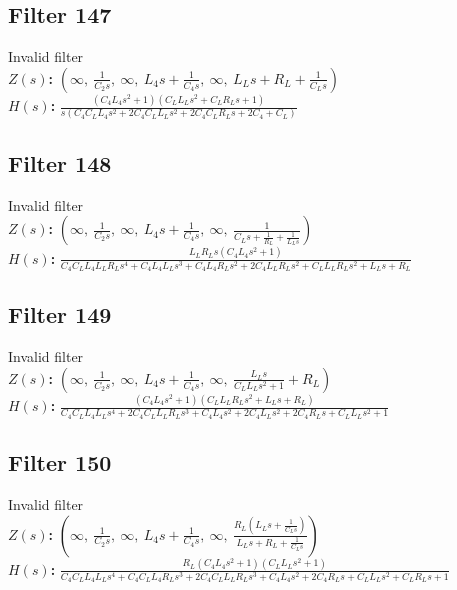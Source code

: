\documentclass{article}
\begin{document}
\subsection*{Filter 147}
Invalid filter \\ 
\textbf{$Z(s)$:} $\left( \infty, \  \frac{1}{C_{2} s}, \  \infty, \  L_{4} s + \frac{1}{C_{4} s}, \  \infty, \  L_{L} s + R_{L} + \frac{1}{C_{L} s}\right)$ \\ 
\textbf{$H(s)$:} $\frac{\left(C_{4} L_{4} s^{2} + 1\right) \left(C_{L} L_{L} s^{2} + C_{L} R_{L} s + 1\right)}{s \left(C_{4} C_{L} L_{4} s^{2} + 2 C_{4} C_{L} L_{L} s^{2} + 2 C_{4} C_{L} R_{L} s + 2 C_{4} + C_{L}\right)}$ \\ 
\subsection*{Filter 148}
Invalid filter \\ 
\textbf{$Z(s)$:} $\left( \infty, \  \frac{1}{C_{2} s}, \  \infty, \  L_{4} s + \frac{1}{C_{4} s}, \  \infty, \  \frac{1}{C_{L} s + \frac{1}{R_{L}} + \frac{1}{L_{L} s}}\right)$ \\ 
\textbf{$H(s)$:} $\frac{L_{L} R_{L} s \left(C_{4} L_{4} s^{2} + 1\right)}{C_{4} C_{L} L_{4} L_{L} R_{L} s^{4} + C_{4} L_{4} L_{L} s^{3} + C_{4} L_{4} R_{L} s^{2} + 2 C_{4} L_{L} R_{L} s^{2} + C_{L} L_{L} R_{L} s^{2} + L_{L} s + R_{L}}$ \\ 
\subsection*{Filter 149}
Invalid filter \\ 
\textbf{$Z(s)$:} $\left( \infty, \  \frac{1}{C_{2} s}, \  \infty, \  L_{4} s + \frac{1}{C_{4} s}, \  \infty, \  \frac{L_{L} s}{C_{L} L_{L} s^{2} + 1} + R_{L}\right)$ \\ 
\textbf{$H(s)$:} $\frac{\left(C_{4} L_{4} s^{2} + 1\right) \left(C_{L} L_{L} R_{L} s^{2} + L_{L} s + R_{L}\right)}{C_{4} C_{L} L_{4} L_{L} s^{4} + 2 C_{4} C_{L} L_{L} R_{L} s^{3} + C_{4} L_{4} s^{2} + 2 C_{4} L_{L} s^{2} + 2 C_{4} R_{L} s + C_{L} L_{L} s^{2} + 1}$ \\ 
\subsection*{Filter 150}
Invalid filter \\ 
\textbf{$Z(s)$:} $\left( \infty, \  \frac{1}{C_{2} s}, \  \infty, \  L_{4} s + \frac{1}{C_{4} s}, \  \infty, \  \frac{R_{L} \left(L_{L} s + \frac{1}{C_{L} s}\right)}{L_{L} s + R_{L} + \frac{1}{C_{L} s}}\right)$ \\ 
\textbf{$H(s)$:} $\frac{R_{L} \left(C_{4} L_{4} s^{2} + 1\right) \left(C_{L} L_{L} s^{2} + 1\right)}{C_{4} C_{L} L_{4} L_{L} s^{4} + C_{4} C_{L} L_{4} R_{L} s^{3} + 2 C_{4} C_{L} L_{L} R_{L} s^{3} + C_{4} L_{4} s^{2} + 2 C_{4} R_{L} s + C_{L} L_{L} s^{2} + C_{L} R_{L} s + 1}$ \\ 
\end{document}

